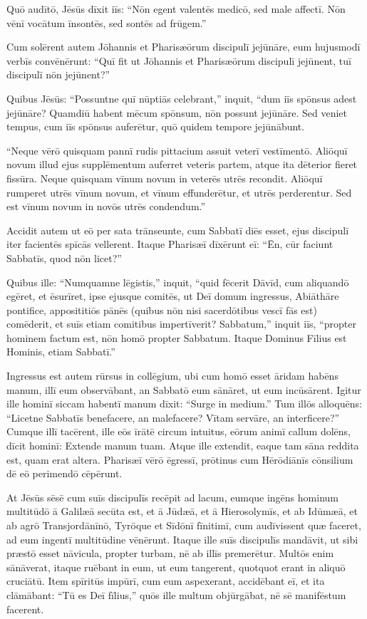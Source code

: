 \Versus Quō audītō, Jēsūs dīxit iīs: ``Nōn egent valentēs medicō, sed male affectī. Nōn vēnī vocātum īnsontēs, sed sontēs ad frūgem.''

\Versus Cum solērent autem Jōhannis et Pharisæōrum discipulī jejūnāre, eum hujusmodī verbīs convēnērunt: ``Quī fit ut Jōhannis et Pharisæōrum discipulī jejūnent, tuī discipulī nōn jejūnent?''

\Versus Quibus Jēsūs: ``Possuntne quī nūptiās celebrant,'' inquit, ``dum iīs spōnsus adest jejūnāre? Quamdiū habent mēcum spōnsum, nōn possunt jejūnāre.
\Versus Sed veniet tempus, cum iīs spōnsus auferētur, quō quidem tempore jejūnābunt.

\Versus ``Neque vērō quisquam pannī rudis pittacium assuit veterī vestīmentō. Aliōquī novum illud ejus supplēmentum auferret veteris partem, atque ita dēterior fieret fissūra.
\Versus Neque quisquam vīnum novum in veterēs utrēs recondit. Aliōquī rumperet utrēs vīnum novum, et vīnum effunderētur, et utrēs perderentur. Sed est vīnum novum in novōs utrēs condendum.''

\Versus Accidit autem ut eō per sata trānseunte, cum Sabbatī diēs esset, ejus discipulī iter facientēs spīcās vellerent.
\Versus Itaque Pharisæī dīxērunt eī: ``Ēn, cūr faciunt Sabbatīs, quod nōn licet?''

\Versus Quibus ille: ``Numquamne lēgistis,'' inquit, ``quid fēcerit Dāvīd, cum aliquandō egēret, et ēsurīret, ipse ejusque comitēs,
\Versus ut Deī domum ingressus, Abiāthāre pontifice, apposititiōs pānēs (quibus nōn nisi sacerdōtibus vescī fās est) comēderit, et suīs etiam comitibus impertīverit?
\Versus Sabbatum,'' inquit iīs, ``propter hominem factum est, nōn homō propter Sabbatum.
\Versus Itaque Dominus Fīlius est Hominis, etiam Sabbatī.''


\Caput
\Versus Ingressus est autem rūrsus in collēgium, ubi cum homō esset āridam habēns manum,
\Versus illī eum observābant, an Sabbatō eum sānāret, ut eum incūsārent.
\Versus Igitur ille hominī siccam habentī manum dīxit: ``Surge in medium.''
\Versus Tum illōs alloquēns: ``Licetne Sabbatīs benefacere, an malefacere? Vītam servāre, an interficere?''
\Versus Cumque illī tacērent, ille eōs īrātē circum intuitus, eōrum animī callum dolēns, dīcit hominī: Extende manum tuam. Atque ille extendit, eaque tam sāna reddita est, quam erat altera.
\Versus Pharisæī vērō ēgressī, prōtinus cum Hērōdiānīs cōnsilium dē eō perimendō cēpērunt.

\Versus At Jēsūs sēsē cum suīs discipulīs recēpit ad lacum, eumque ingēns hominum multitūdō ā Galilæā secūta est, et ā Jūdæā,
\Versus et ā Hierosolymīs, et ab Idūmæā, et ab agrō Transjordānīnō, Tyrōque et Sīdōnī fīnitimī, cum audīvissent quæ faceret, ad eum ingentī multitūdine vēnērunt.
\Versus Itaque ille suīs discipulīs mandāvit, ut sibi præstō esset nāvicula, propter turbam, nē ab illīs premerētur.
\Versus Multōs enim sānāverat, itaque ruēbant in eum, ut eum tangerent, quotquot erant in aliquō cruciātū.
\Versus Item spīritūs impūrī, cum eum aspexerant, accidēbant eī, et ita clāmābant: ``Tū es Deī fīlius,''
\Versus quōs ille multum objūrgābat, nē sē manifēstum facerent.

